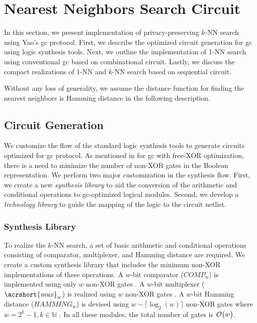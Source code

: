 \section{Nearest Neighbors Search Circuit}\label{sec:knn-circuit}
In this section, we present implementation of privacy-preserving $k$-NN search using Yao's \acrshort{gc} protocol.
First, we describe the optimized circuit generation for \acrshort{gc} using logic synthesis tools.
Next, we outline the implementation of 1-NN search using conventional \acrshort{gc} based on combinational circuit.
Lastly, we discuss the compact realizations of 1-NN and $k$-NN search based on sequential circuit.

Without any loss of generality, we assume the distance function for finding the nearest neighbors is Hamming distance in the following description.

\subsection{Circuit Generation}\label{ssec:knn-circuitgen}
We customize the flow of the standard logic synthesis tools to generate circuits optimized for \acrshort{gc} protocol.
As mentioned in  for \acrshort{gc} with free-XOR optimization, there is a need to minimize the number of non-XOR gates in the Boolean representation.
We perform two major customization in the synthesis flow.
First, we create a new \emph{synthesis library} to aid the conversion of the arithmetic and conditional operations to \acrshort{gc}-optimized logical modules.
Second, we develop a \emph{technology library} to guide the mapping of the logic to the circuit netlist.


\subsubsection{Synthesis Library}
To realize the $k$-NN search, a set of basic arithmetic and conditional operations consisting of comparator, multiplexer, and Hamming distance are required.
We create a custom synthesis library that includes the minimum non-XOR implementations of these operations.
A $w$-bit comparator ($\mathit{COMP}_w$) is implemented using only $w$ non-XOR gates \cite{kolesnikov2009improved}.
A $w$-bit multiplexer ($\mathit{\acrshort{mux}}_w$) is realized using $w$ non-XOR gates \cite{kolesnikov2008improved}.
A $w$-bit Hamming distance ($\mathit{HAMMING}_w$) is devised using $w-\lceil \log _2(w) \rceil$ non-XOR gates where $w=2^k-1, k \in \mathbb{N}$ \cite{boyar2006concrete}.
In all these modules, the total number of gates is $\mathcal{O}\bigl(w\bigr)$.


